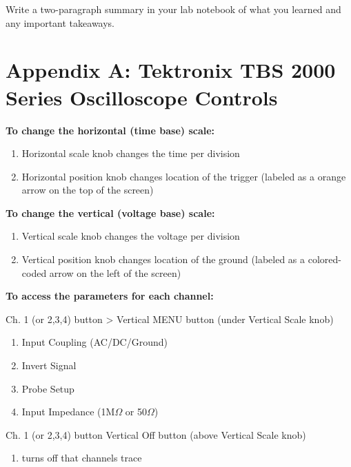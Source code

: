 \documentclass[10pt]{PhysLab1C} %
\begin{document}
Write a two-paragraph summary in your lab notebook of what you learned
and any important takeaways.


\section*{Appendix A: Tektronix TBS 2000 Series Oscilloscope Controls}


\textbf{To change the horizontal (time base) scale:}

\begin{enumerate}
\def\labelenumi{\arabic{enumi}.}
\item
  Horizontal scale knob changes the time per division
\item
  Horizontal position knob changes location of the trigger (labeled as a
  orange arrow on the top of the screen)
\end{enumerate}

\textbf{To change the vertical (voltage base) scale:}

\begin{enumerate}
\def\labelenumi{\arabic{enumi}.}
\item
  Vertical scale knob changes the voltage per division
\item
  Vertical position knob changes location of the ground (labeled as a
  colored-coded arrow on the left of the screen)
\end{enumerate}

\textbf{To access the parameters for each channel:}

Ch. 1 (or 2,3,4) button \textgreater{} Vertical MENU button (under
Vertical Scale knob)

\begin{enumerate}
\def\labelenumi{\arabic{enumi}.}
\item
  Input Coupling (AC/DC/Ground)
\item
  Invert Signal
\item
  Probe Setup
\item
  Input Impedance (1M$\Omega$ or 50$\Omega$)
\end{enumerate}

Ch. 1 (or 2,3,4) button  Vertical Off button (above Vertical Scale
knob)

\begin{enumerate}
\def\labelenumi{\arabic{enumi}.}
\item
  turns off that channel\textquotesingle s trace
\end{enumerate}
\end{document}
